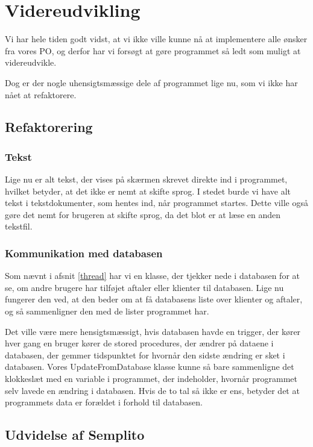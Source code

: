 \section{Videreudvikling}
\label{kapitel:Videreudvikling}

Vi har hele tiden godt vidst, at vi ikke ville kunne nå at implementere alle ønsker fra vores PO, og derfor har vi forsøgt at gøre programmet så ledt som muligt at videreudvikle.

Dog er der nogle uhensigtsmæssige dele af programmet lige nu, som vi ikke har nået at refaktorere.

\subsection{Refaktorering}
\subsubsection{Tekst}
Lige nu er alt tekst, der vises på skærmen skrevet direkte ind i programmet, hvilket betyder, at det ikke er nemt at skifte sprog.
I stedet burde vi have alt tekst i tekstdokumenter, som hentes ind, når programmet startes.
Dette ville også gøre det nemt for brugeren at skifte sprog, da det blot er at læse en anden tekstfil.

\subsubsection{Kommunikation med databasen}
Som nævnt i afsnit \ref{thread} har vi en klasse, der tjekker nede i databasen for at se, om andre brugere har tilføjet aftaler eller klienter til databasen.
Lige nu fungerer den ved, at den beder om at få databasens liste over klienter og aftaler, og så sammenligner den med de lister programmet har.

Det ville være mere hensigtsmæssigt, hvis databasen havde en trigger, der kører hver gang en bruger kører de stored procedures, der ændrer på dataene i databasen, der gemmer tidspunktet for hvornår den sidste ændring er sket i databasen.
Vores UpdateFromDatabase klasse kunne så bare sammenligne det klokkeslæt med en variable i programmet, der indeholder, hvornår programmet selv lavede en ændring i databasen.
Hvis de to tal så ikke er ens, betyder det at programmets data er forældet i forhold til databasen.

\subsection{Udvidelse af Semplito}


